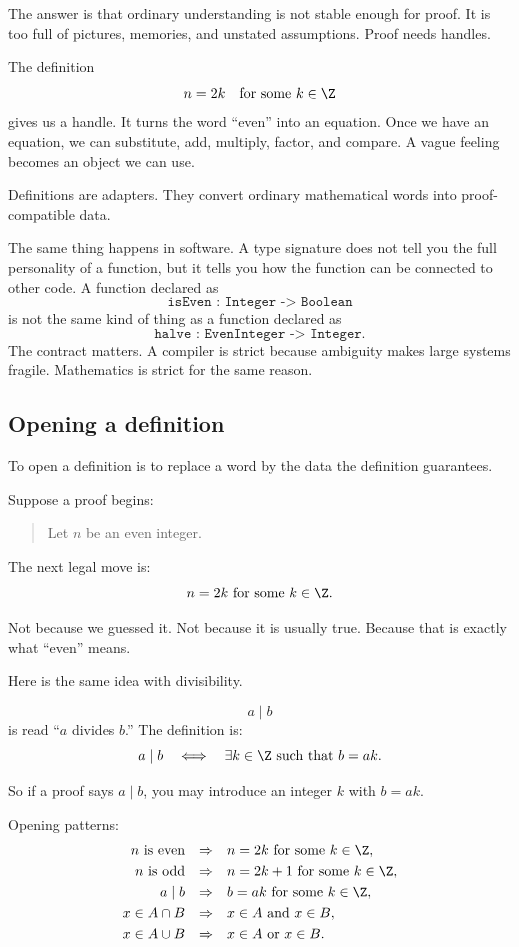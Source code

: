 The answer is that ordinary understanding is not stable enough for proof. It is too full of pictures, memories, and unstated assumptions. Proof needs handles.

The definition
\[
n=2k\quad\text{for some }k\in\Z
\]
gives us a handle. It turns the word ``even'' into an equation. Once we have an equation, we can substitute, add, multiply, factor, and compare. A vague feeling becomes an object we can use.

\begin{intuitionbox}
Definitions are adapters. They convert ordinary mathematical words into proof-compatible data.
\end{intuitionbox}

The same thing happens in software. A type signature does not tell you the full personality of a function, but it tells you how the function can be connected to other code. A function declared as
\[
\texttt{isEven : Integer -> Boolean}
\]
is not the same kind of thing as a function declared as
\[
\texttt{halve : EvenInteger -> Integer}.
\]
The contract matters. A compiler is strict because ambiguity makes large systems fragile. Mathematics is strict for the same reason.

\subsection{Opening a definition}

To open a definition is to replace a word by the data the definition guarantees.

Suppose a proof begins:

\begin{quote}
Let $n$ be an even integer.
\end{quote}

The next legal move is:
\[
n=2k\text{ for some }k\in\Z.
\]

Not because we guessed it. Not because it is usually true. Because that is exactly what ``even'' means.

Here is the same idea with divisibility.

\[
a\mid b
\]
is read ``$a$ divides $b$.'' The definition is:
\[
a\mid b\quad\Longleftrightarrow\quad \exists k\in\Z\text{ such that }b=ak.
\]

So if a proof says $a\mid b$, you may introduce an integer $k$ with $b=ak$.

\begin{formalbox}
Opening patterns:
\[
\begin{array}{rcl}
n\text{ is even} &\Rightarrow& n=2k\text{ for some }k\in\Z,\\[0.3em]
n\text{ is odd} &\Rightarrow& n=2k+1\text{ for some }k\in\Z,\\[0.3em]
a\mid b &\Rightarrow& b=ak\text{ for some }k\in\Z,\\[0.3em]
x\in A\cap B &\Rightarrow& x\in A\text{ and }x\in B,\\[0.3em]
x\in A\cup B &\Rightarrow& x\in A\text{ or }x\in B.
\end{array}
\]
\end{formalbox}

